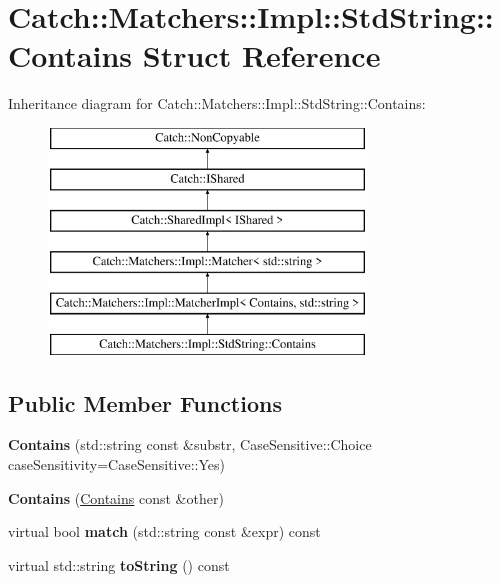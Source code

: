 \hypertarget{structCatch_1_1Matchers_1_1Impl_1_1StdString_1_1Contains}{}\section{Catch\+:\+:Matchers\+:\+:Impl\+:\+:Std\+String\+:\+:Contains Struct Reference}
\label{structCatch_1_1Matchers_1_1Impl_1_1StdString_1_1Contains}
Inheritance diagram for Catch\+:\+:Matchers\+:\+:Impl\+:\+:Std\+String\+:\+:Contains\+:\begin{figure}[H]
\begin{center}
\leavevmode
\includegraphics[height=6.000000cm]{structCatch_1_1Matchers_1_1Impl_1_1StdString_1_1Contains}
\end{center}
\end{figure}
\subsection*{Public Member Functions}
\begin{DoxyCompactItemize}
\item 
{\bfseries Contains} (std\+::string const \&substr, Case\+Sensitive\+::\+Choice case\+Sensitivity=Case\+Sensitive\+::\+Yes)\hypertarget{structCatch_1_1Matchers_1_1Impl_1_1StdString_1_1Contains_a7a062d83bd3e3075929dbb55e1c24258}{}\label{structCatch_1_1Matchers_1_1Impl_1_1StdString_1_1Contains_a7a062d83bd3e3075929dbb55e1c24258}

\item 
{\bfseries Contains} (\hyperlink{structCatch_1_1Matchers_1_1Impl_1_1StdString_1_1Contains}{Contains} const \&other)\hypertarget{structCatch_1_1Matchers_1_1Impl_1_1StdString_1_1Contains_ad6b1ef653dfcb3bab43c43be043dc4e8}{}\label{structCatch_1_1Matchers_1_1Impl_1_1StdString_1_1Contains_ad6b1ef653dfcb3bab43c43be043dc4e8}

\item 
virtual bool {\bfseries match} (std\+::string const \&expr) const \hypertarget{structCatch_1_1Matchers_1_1Impl_1_1StdString_1_1Contains_aa27d823dea5770025a24424fc3355a6f}{}\label{structCatch_1_1Matchers_1_1Impl_1_1StdString_1_1Contains_aa27d823dea5770025a24424fc3355a6f}

\item 
virtual std\+::string {\bfseries to\+String} () const \hypertarget{structCatch_1_1Matchers_1_1Impl_1_1StdString_1_1Contains_a226755351f3598179925f3ab89d6def7}{}\label{structCatch_1_1Matchers_1_1Impl_1_1StdString_1_1Contains_a226755351f3598179925f3ab89d6def7}

\end{DoxyCompactItemize}
